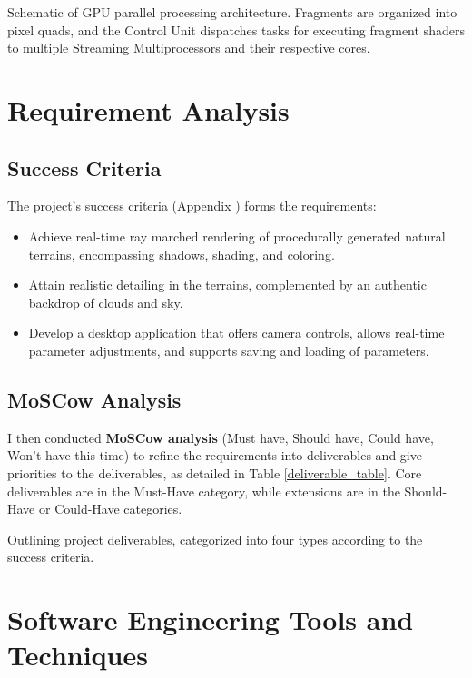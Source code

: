 {Schematic of GPU parallel processing architecture. Fragments are organized into pixel quads, and the Control Unit dispatches tasks for executing fragment shaders to multiple Streaming Multiprocessors and their respective cores.}

\section{Requirement Analysis}
\label{sec:Requirement}

\subsection{Success Criteria}
The project’s success criteria (Appendix ) forms the requirements:

\begin{itemize}
    \item Achieve real-time ray marched rendering of procedurally generated natural terrains, encompassing shadows, shading, and coloring. 
    \item Attain realistic detailing in the terrains, complemented by an authentic backdrop of clouds and sky.
    \item Develop a desktop application that offers camera controls, allows real-time parameter adjustments, and supports saving and loading of parameters.
\end{itemize}

\subsection{MoSCow Analysis}

I then conducted \textbf{MoSCow analysis} \cite{clegg_case_1994} (Must have, Should have, Could have, Won't have this time) to refine the requirements into deliverables and give priorities to the deliverables, as detailed in Table \ref{deliverable_table}. Core deliverables are in the Must-Have category, while extensions are in the Should-Have or Could-Have categories. 

{Outlining project deliverables, categorized into four types according to the success criteria.}

\section{Software Engineering Tools and Techniques}
\label{sec:Software Engineering}

